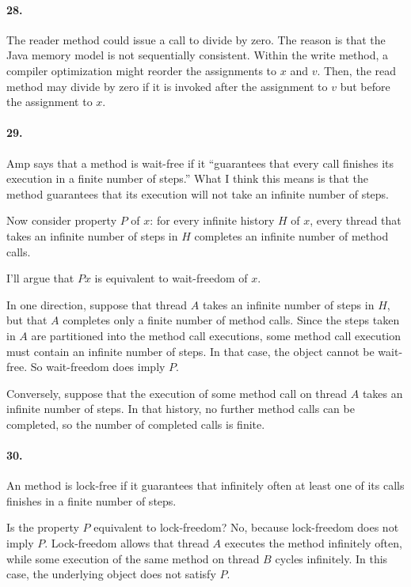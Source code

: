 \documentclass[
]{article}
\begin{document}
\paragraph{28.} The reader method could issue a call to divide by zero.  The reason is that the Java memory model is not sequentially consistent.  Within the write method, a compiler optimization might reorder the assignments to $x$ and $v$.  Then, the read method may divide by zero if it is invoked after the assignment to $v$ but before the assignment to $x$.

\paragraph{29.} Amp says that a method is wait-free if it ``guarantees that every call finishes its execution in a finite number of steps.''  What I think this means is that the method guarantees that its execution will not take an infinite number of steps.

Now consider property $P$ of $x$:  for every infinite history $H$ of $x$, every thread that takes an infinite number of steps in $H$ completes an infinite number of method calls.

I'll argue that $Px$ is equivalent to wait-freedom of $x$.

In one direction, suppose that thread $A$ takes an infinite number of steps in $H$, but that $A$ completes only a finite number of method calls.  Since the steps taken in $A$ are partitioned into the method call executions, some method call execution must contain an infinite number of steps.  In that case, the object cannot be wait-free.  So wait-freedom does imply $P$.

Conversely, suppose that the execution of some method call on thread $A$ takes an infinite number of steps.  In that history, no further method calls can be completed, so the number of completed calls is finite.

\paragraph{30.} An method is lock-free if it guarantees that infinitely often at least one of its calls finishes in a finite number of steps.  

Is the property $P$ equivalent to lock-freedom?  No, because lock-freedom does not imply $P$.  Lock-freedom allows that thread $A$ executes the method infinitely often, while some execution of the same method on thread $B$ cycles infinitely.  In this case, the underlying object does not satisfy $P$.  
\end{document}
